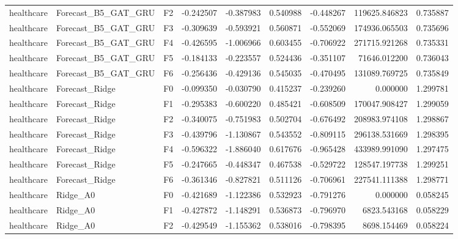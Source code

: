 \begin{tabular}{lllrrrrrr}
healthcare &          Forecast\_B5\_GAT\_GRU &  F2 & -0.242507 & -0.387983 & 0.540988 & -0.448267 &    119625.846823 &             0.735887 \\
healthcare &          Forecast\_B5\_GAT\_GRU &  F3 & -0.309639 & -0.593921 & 0.560871 & -0.552069 &    174936.065503 &             0.735696 \\
healthcare &          Forecast\_B5\_GAT\_GRU &  F4 & -0.426595 & -1.006966 & 0.603455 & -0.706922 &    271715.921268 &             0.735331 \\
healthcare &          Forecast\_B5\_GAT\_GRU &  F5 & -0.184133 & -0.223557 & 0.524436 & -0.351107 &     71646.012200 &             0.736043 \\
healthcare &          Forecast\_B5\_GAT\_GRU &  F6 & -0.256436 & -0.429136 & 0.545035 & -0.470495 &    131089.769725 &             0.735849 \\
healthcare &               Forecast\_Ridge &  F0 & -0.099350 & -0.030790 & 0.415237 & -0.239260 &         0.000000 &             1.299781 \\
healthcare &               Forecast\_Ridge &  F1 & -0.295383 & -0.600220 & 0.485421 & -0.608509 &    170047.908427 &             1.299059 \\
healthcare &               Forecast\_Ridge &  F2 & -0.340075 & -0.751983 & 0.502704 & -0.676492 &    208983.974108 &             1.298867 \\
healthcare &               Forecast\_Ridge &  F3 & -0.439796 & -1.130867 & 0.543552 & -0.809115 &    296138.531669 &             1.298395 \\
healthcare &               Forecast\_Ridge &  F4 & -0.596322 & -1.886040 & 0.617676 & -0.965428 &    433989.991090 &             1.297475 \\
healthcare &               Forecast\_Ridge &  F5 & -0.247665 & -0.448347 & 0.467538 & -0.529722 &    128547.197738 &             1.299251 \\
healthcare &               Forecast\_Ridge &  F6 & -0.361346 & -0.827821 & 0.511126 & -0.706961 &    227541.111388 &             1.298771 \\
healthcare &                     Ridge\_A0 &  F0 & -0.421689 & -1.122386 & 0.532923 & -0.791276 &         0.000000 &             0.058245 \\
healthcare &                     Ridge\_A0 &  F1 & -0.427872 & -1.148291 & 0.536873 & -0.796970 &      6823.543168 &             0.058229 \\
healthcare &                     Ridge\_A0 &  F2 & -0.429549 & -1.155362 & 0.538016 & -0.798395 &      8698.154469 &             0.058224 \\

\end{tabular}
